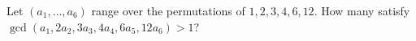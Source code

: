 Let $(a_1,\ldots,a_6)$ range over the permutations of $1,2,3,4,6,12$. How many satisfy $\gcd(a_1,2a_2,3a_3,4a_4,6a_5,12a_6)>1$?
